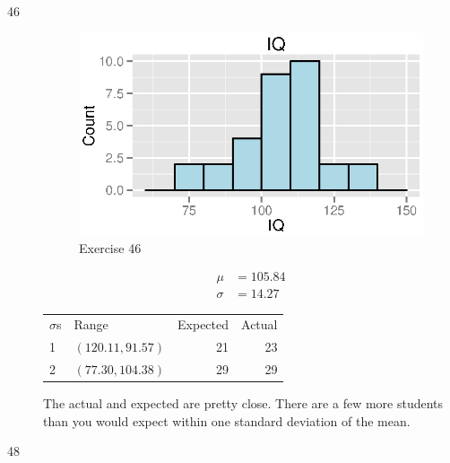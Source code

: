 \documentclass{exam}
\begin{document}
\begin{description}
      \item[46]
        \begin{figure}[H]
          \centering
          \includegraphics{figures/ex46.eps}
          \caption{Exercise 46}
        \end{figure}

        \begin{align*}
          \mu    & = 105.84 \\
          \sigma & = 14.27
        \end{align*}

        \begin{tabular}[H]{llrr}
          \toprule
          \midrule
          $\sigma$s & Range             & Expected & Actual \\
          1         & $(120.11, 91.57)$ & 21       & 23 \\
          2         & $(77.30, 104.38)$ & 29       & 29 \\
          \bottomrule
        \end{tabular}

        The actual and expected are pretty close.  There are a few more students than you
        would expect within one standard deviation of the mean.  

      \pagebreak

      \item[48]
\end{description}
\end{document}
